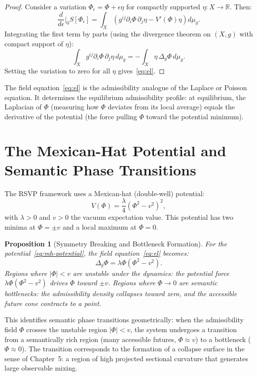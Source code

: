 \documentclass[12pt, oneside]{book}
\theoremstyle{plain-flyxion}
\newtheorem{proposition}[theorem]{Proposition}
\theoremstyle{definition-flyxion}
\begin{document}
\begin{proof}
Consider a variation $\Phi_\epsilon = \Phi + \epsilon\eta$ for compactly supported $\eta:
X \to \mathbb{R}$. Then:
\[
\frac{d}{d\epsilon}\bigg|_0 S[\Phi_\epsilon]
= \int_X \left(g^{ij}\partial_i\Phi\,\partial_j\eta - V'(\Phi)\eta\right) d\mu_g.
\]
Integrating the first term by parts (using the divergence theorem on $(X,g)$ with
compact support of $\eta$):
\[
\int_X g^{ij}\partial_i\Phi\,\partial_j\eta\, d\mu_g
= -\int_X \eta\, \Delta_g\Phi\, d\mu_g.
\]
Setting the variation to zero for all $\eta$ gives~\eqref{eq:el}.
\end{proof}

The field equation~\eqref{eq:el} is the admissibility analogue of the Laplace or
Poisson equation. It determines the equilibrium admissibility profile: at equilibrium,
the Laplacian of $\Phi$ (measuring how $\Phi$ deviates from its local average) equals
the derivative of the potential (the force pulling $\Phi$ toward the potential minimum).

\section{The Mexican-Hat Potential and Semantic Phase Transitions}

The RSVP framework uses a Mexican-hat (double-well) potential:
\begin{equation}\label{eq:mh-potential}
V(\Phi) = \frac{\lambda}{4}(\Phi^2 - v^2)^2,
\end{equation}
with $\lambda > 0$ and $v > 0$ the vacuum expectation value. This potential has two
minima at $\Phi = \pm v$ and a local maximum at $\Phi = 0$.

\begin{proposition}[Symmetry Breaking and Bottleneck Formation]\label{prop:sym-break}
For the potential~\eqref{eq:mh-potential}, the field equation~\eqref{eq:el} becomes:
\begin{equation}\label{eq:mh-el}
\Delta_g \Phi = \lambda\Phi(\Phi^2 - v^2).
\end{equation}
Regions where $|\Phi| < v$ are unstable under the dynamics: the potential force
$\lambda\Phi(\Phi^2 - v^2)$ drives $\Phi$ toward $\pm v$. Regions where $\Phi \to 0$
are semantic bottlenecks: the admissibility density collapses toward zero, and the
accessible future cone contracts to a point.
\end{proposition}

This identifies semantic phase transitions geometrically: when the admissibility field
$\Phi$ crosses the unstable region $|\Phi| < v$, the system undergoes a transition from
a semantically rich region (many accessible futures, $\Phi \approx v$) to a bottleneck
($\Phi \approx 0$). The transition corresponds to the formation of a collapse surface in
the sense of Chapter~5: a region of high projected sectional curvature that generates
large observable mixing.
\end{document}
